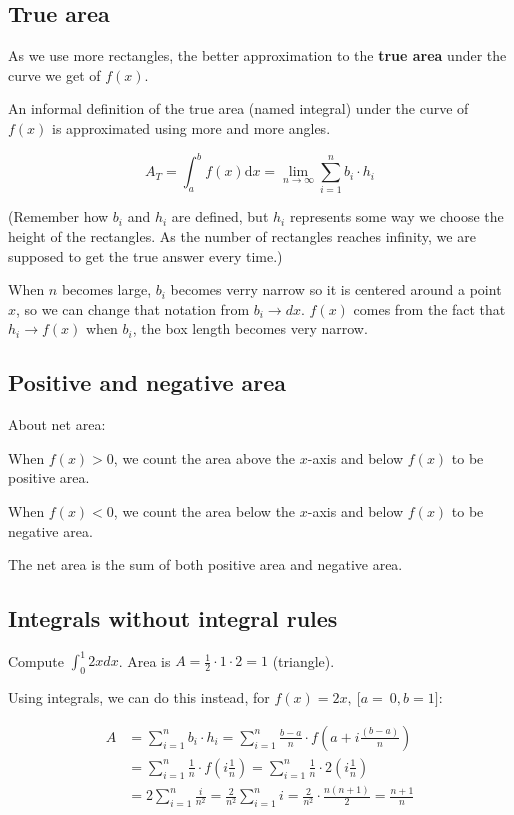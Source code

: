 \documentclass[12pt]{article}
\theoremstyle{plain}
\theoremstyle{remark}
\theoremstyle{definition}
\begin{document}
\subsection{True area}

As we use more rectangles, the better approximation to the \textbf{true
area} under the curve we get of \(f(x)\).

An informal definition of the true area (named integral) under the curve
of \(f(x)\) is approximated using more and more angles.

\[A_{T} = \int_{a}^{b}{f(x)\text{d}x} = \lim_{n \rightarrow \infty}{\sum_{i = 1}^{n}{b_{i} \cdot h_{i}}}\]

(Remember how \(b_{i}\) and \(h_{i}\) are defined, but \(h_{i}\)
represents some way we choose the height of the rectangles. As the
number of rectangles reaches infinity, we are supposed to get the true
answer every time.)

When \(n\) becomes large, \(b_{i}\) becomes verry narrow so it is
centered around a point \(x\), so we can change that notation from
\(b_{i} \rightarrow dx\). \(f(x)\) comes from the fact that
\(h_{i} \rightarrow f(x)\) when \(b_{i}\), the box length becomes very
narrow.


\subsection{Positive and negative
area}

About net area:

When \(f(x) > 0\), we count the area above the \(x\)-axis and below
\(f(x)\) to be positive area.

When \(f(x) < 0\), we count the area below the \(x\)-axis and below
\(f(x)\) to be negative area.


The net area is the sum of both positive area and negative area.


\subsection{Integrals without integral
rules}

Compute \(\int_{0}^{1}{2xdx}\). Area is
\(A = \frac{1}{2} \cdot 1 \cdot 2 = 1\) (triangle).


Using integrals, we can do this instead, for
\(f(x) = 2x,\ \lbrack a = \ 0,b = 1\rbrack\):

\begin{align*}
A &= \sum_{i = 1}^{n}{b_{i} \cdot h_{i}} = \sum_{i = 1}^{n}{\frac{b - a}{n} \cdot f\left( a + i\frac{(b - a)}{n} \right)} \\
&= \sum_{i = 1}^{n}{\frac{1}{n} \cdot f\left( i\frac{1}{n} \right)} = \sum_{i = 1}^{n}{\frac{1}{n} \cdot 2\left( i\frac{1}{n} \right)} \\
&= 2\sum_{i = 1}^{n}\frac{i}{n^{2}} = \frac{2}{n^{2}}\sum_{i = 1}^{n}i = \frac{2}{n^{2}} \cdot \frac{n(n + 1)}{2} = \frac{n + 1}{n}
\end{align*}
\end{document}
